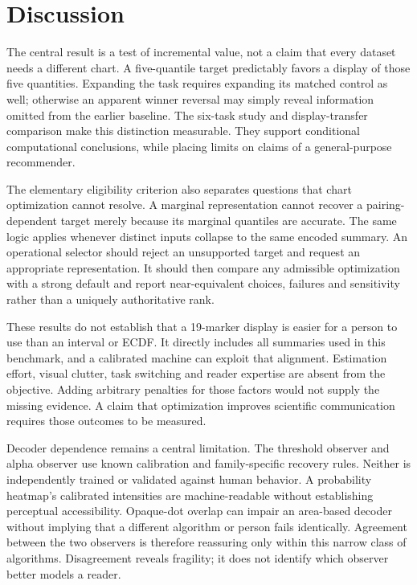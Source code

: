 \documentclass[11pt]{article}
\begin{document}
\section*{Discussion}
The central result is a test of incremental value, not a claim that every dataset needs a different chart. A five-quantile target predictably favors a display of those five quantities. Expanding the task requires expanding its matched control as well; otherwise an apparent winner reversal may simply reveal information omitted from the earlier baseline. The six-task study and display-transfer comparison make this distinction measurable. They support conditional computational conclusions, while placing limits on claims of a general-purpose recommender.

The elementary eligibility criterion also separates questions that chart optimization cannot resolve. A marginal representation cannot recover a pairing-dependent target merely because its marginal quantiles are accurate. The same logic applies whenever distinct inputs collapse to the same encoded summary. An operational selector should reject an unsupported target and request an appropriate representation. It should then compare any admissible optimization with a strong default and report near-equivalent choices, failures and sensitivity rather than a uniquely authoritative rank.

These results do not establish that a 19-marker display is easier for a person to use than an interval or ECDF. It directly includes all summaries used in this benchmark, and a calibrated machine can exploit that alignment. Estimation effort, visual clutter, task switching and reader expertise are absent from the objective. Adding arbitrary penalties for those factors would not supply the missing evidence. A claim that optimization improves scientific communication requires those outcomes to be measured.

Decoder dependence remains a central limitation. The threshold observer and alpha observer use known calibration and family-specific recovery rules. Neither is independently trained or validated against human behavior. A probability heatmap's calibrated intensities are machine-readable without establishing perceptual accessibility.\cite{crameri2020} Opaque-dot overlap can impair an area-based decoder without implying that a different algorithm or person fails identically. Agreement between the two observers is therefore reassuring only within this narrow class of algorithms. Disagreement reveals fragility; it does not identify which observer better models a reader.
\end{document}
